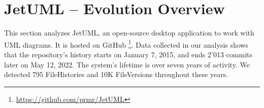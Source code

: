 
\section{JetUML – Evolution Overview}
This section analyzes JetUML, an open-source desktop application to work with UML diagrams. It is hosted on GitHub \footnote{\url{https://github.com/prmr/JetUML}}. Data collected in our analysis shows that the repository's history starts on January 7, 2015, and ends 2'013 commits later on May 12, 2022. The system's lifetime is over seven years of activity. We detected 795 FileHistories and 10K FileVersions throughout these years.

